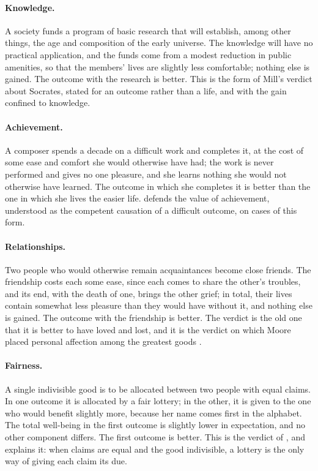 \documentclass{situationist-preprint}
\begin{document}
\paragraph{Knowledge.} A society funds a program of basic research that will establish, among other things, the age and composition of the early universe. The knowledge will have no practical application, and the funds come from a modest reduction in public amenities, so that the members' lives are slightly less comfortable; nothing else is gained. The outcome with the research is better. This is the form of Mill's verdict about Socrates, stated for an outcome rather than a life, and with the gain confined to knowledge.

\paragraph{Achievement.} A composer spends a decade on a difficult work and completes it, at the cost of some ease and comfort she would otherwise have had; the work is never performed and gives no one pleasure, and she learns nothing she would not otherwise have learned. The outcome in which she completes it is better than the one in which she lives the easier life. \citet{Bradford2015} defends the value of achievement, understood as the competent causation of a difficult outcome, on cases of this form.

\paragraph{Relationships.} Two people who would otherwise remain acquaintances become close friends. The friendship costs each some ease, since each comes to share the other's troubles, and its end, with the death of one, brings the other grief; in total, their lives contain somewhat less pleasure than they would have without it, and nothing else is gained. The outcome with the friendship is better. The verdict is the old one that it is better to have loved and lost, and it is the verdict on which Moore placed personal affection among the greatest goods \citep[\S113]{Moore1903}.

\paragraph{Fairness.} A single indivisible good is to be allocated between two people with equal claims. In one outcome it is allocated by a fair lottery; in the other, it is given to the one who would benefit slightly more, because her name comes first in the alphabet. The total well-being in the first outcome is slightly lower in expectation, and no other component differs. The first outcome is better. This is the verdict of \citet{Diamond1967}, and \citet{Broome1990} explains it: when claims are equal and the good indivisible, a lottery is the only way of giving each claim its due.
\end{document}
